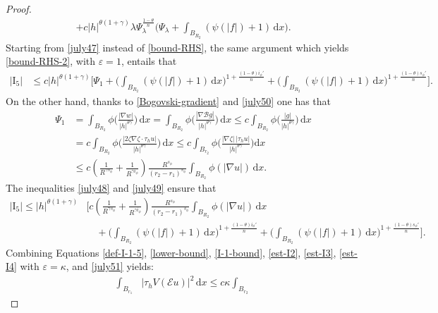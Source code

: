\documentclass[leqno,11pt]{amsart}%
\numberwithin{equation}{section}
\def\d{\mathrm{d}}
\def\E{\mathcal{E}}
\def\dx{\d x}
\theoremstyle{definition}
\numberwithin{equation}{section}
\begin{document}
\begin{proof}
\begin{align}
    +
    c|h|^{{\theta(1+\gamma)}} \lambda\Psi_\lambda^{\frac{{1-\theta}}{n}}\bigg(\Psi_\lambda+ \int_{B_{R_2}}(\psi(|f|) +1) \, \d x\bigg).
\end{align}
Starting from \eqref{july47} instead of \eqref{bound-RHS}, the same argument which yields
\eqref{bound-RHS-2}, with $\varepsilon =1$, entails that
\begin{align}
    \label{july48}
     |\mathrm{I}_5| & \leq
     c|h|^{{\theta(1+\gamma)}}\bigg[ \Psi_1+\bigg(\int_{B_{R_2}}(\psi(|f|)+1)\,\dx\bigg)^{1+\frac{({1-\theta}) {i_\phi'}}{n}}+  \bigg(\int_{B_{R_2}}(\psi(|f|)+1)\,\dx\bigg)^{1+\frac{({1-\theta}) {s_\phi'}}{n}}\bigg].
\end{align}
On the other hand,  thanks to \eqref{Bogovski-gradient} 
and \eqref{july50} one has that
\begin{align}
    \label{july49}
    \Psi_1& = \int_{B_{R_2}}\phi\bigg(\frac{|\nabla w|}{|h|^{{\theta\gamma}}}\bigg)\, \d x=
\int_{B_{R_2}}\phi\bigg(\frac{|\nabla \mathcal Bg|}{|h|^{{\theta\gamma}}}\bigg)\, \d x \leq c\int_{B_{R_2}}\phi\bigg(\frac{|g|}{|h|^{{\theta\gamma}}}\bigg)\, \d x
\\ \nonumber & = c \int_{B_{R_2}}\phi\bigg(\frac{|2\zeta\nabla\zeta\cdot\tau_hu|}{|h|^{{\theta\gamma}}}\bigg)\, \d x
\leq  c\int_{B_{r_2}}  \phi\Big(\frac{|\nabla\zeta|\,|\tau_hu|}{|h|^{{\theta\gamma}}}\Big)\dx\\\nonumber
&\le
{c\left(\frac{1}{R^{\gamma s_\phi}}+\frac{1}{R^{\gamma i_\phi}}\right)\frac{R^{s_\phi}}{(r_2-r_1)^{s_\phi}}}\int_{B_{R_2}} \phi(|\nabla u|)\,\dx.
\end{align} 
The inequalities \eqref{july48} and \eqref{july49} ensure that
\begin{align}
    \label{july51}
     |\mathrm{I}_5|  \leq
     |h|^{{\theta(1+\gamma)}}&\bigg[ {c\left(\frac{1}{R^{\gamma s_\phi}}+\frac{1}{R^{\gamma i_\phi}}\right)\frac{R^{s_\phi}}{(r_2-r_1)^{s_\phi}}}\int_{B_{R_2}} \phi(|\nabla u|)\,\dx
\\ \nonumber & \quad +\bigg(\int_{B_{R_2}}(\psi(|f|)+1)\,\dx\bigg)^{1+\frac{({1-\theta}) {i_\phi'}}{n}}+  \bigg(\int_{B_{R_2}}(\psi(|f|)+1)\,\dx\bigg)^{1+\frac{({1-\theta}){s_\phi'}}{n}}\bigg].
\end{align}
 Combining Equations \eqref{def-I-1-5}, \eqref{lower-bound}, \eqref{I-1-bound},
  \eqref{est-I2}, \eqref{est-I3}, \eqref{est-I4}   with $\varepsilon =\kappa$, and \eqref{july51}
  yields:
  \begin{align}\label{july53}
    \int_{B_{r_1}}&|\tau_h V(\E u)|^2\,\dx
    \le
      c\kappa\int_{B_{r_2}}

\end{align}
\end{proof}
\end{document}
